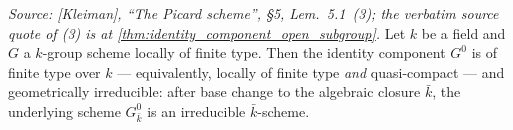 \begin{theorem}\leanok
  \label{thm:identity_component_finite_type_geom_irreducible}

  \textit{Source: [Kleiman], ``The Picard scheme'', \S 5,
  Lem.~5.1~(3); the verbatim source quote of (3) is at
  \cref{thm:identity_component_open_subgroup}.}
  Let \(k\) be a field and \(G\) a \(k\)-group scheme locally of finite
  type. Then the identity component \(G^0\) is of finite type over
  \(k\) --- equivalently, locally of finite type \emph{and}
  quasi-compact --- and geometrically irreducible: after base change
  to the algebraic closure \(\bar k\), the underlying scheme
  \(G^0_{\bar k}\) is an irreducible \(\bar k\)-scheme.
\end{theorem}

